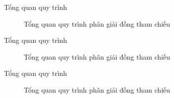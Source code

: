 \documentclass[9pt,xcolor=table,hyperref=unicode]{beamer}
\begin{document}
	\begin{frame}{Tổng quan quy trình}		
		\begin{figure}[H]
			\LARGE 
			\centering				
			\resizebox{100mm}{!}{}
			\caption{Tổng quan quy trình phân giải đồng tham chiếu}									
		\end{figure}
	\end{frame}

	\begin{frame}{Tổng quan quy trình}		
		\begin{figure}[H]
			\LARGE 
			\centering				
			\resizebox{100mm}{!}{}
			\caption{Tổng quan quy trình phân giải đồng tham chiếu}									
		\end{figure}
	\end{frame}

	\begin{frame}{Tổng quan quy trình}		
		\begin{figure}[H]
			\LARGE 
			\centering				
			\resizebox{100mm}{!}{}
			\caption{Tổng quan quy trình phân giải đồng tham chiếu}									
		\end{figure}
	\end{frame}
\end{document}
